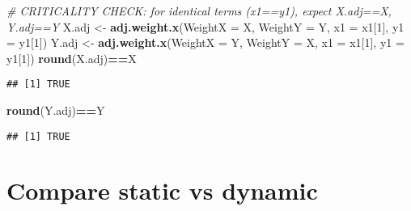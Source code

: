 \documentclass[
]{article}
\newenvironment{Shaded}{\begin{snugshade}}{\end{snugshade}}
\newcommand{\AttributeTok}[1]{\textcolor[rgb]{0.13,0.29,0.53}{#1}}
\newcommand{\CommentTok}[1]{\textcolor[rgb]{0.56,0.35,0.01}{\textit{#1}}}
\newcommand{\DecValTok}[1]{\textcolor[rgb]{0.00,0.00,0.81}{#1}}
\newcommand{\FunctionTok}[1]{\textcolor[rgb]{0.13,0.29,0.53}{\textbf{#1}}}
\newcommand{\NormalTok}[1]{#1}
\newcommand{\OtherTok}[1]{\textcolor[rgb]{0.56,0.35,0.01}{#1}}
\newcommand{\SpecialCharTok}[1]{\textcolor[rgb]{0.81,0.36,0.00}{\textbf{#1}}}
\begin{document}
\begin{Shaded}
\begin{Highlighting}[]
\CommentTok{\# CRITICALITY CHECK: for identical terms (x1==y1), expect X.adj==X, Y.adj==Y}
\NormalTok{X.adj }\OtherTok{\textless{}{-}} \FunctionTok{adj.weight.x}\NormalTok{(}\AttributeTok{WeightX =}\NormalTok{ X, }\AttributeTok{WeightY =}\NormalTok{ Y, }\AttributeTok{x1 =}\NormalTok{ x1[}\DecValTok{1}\NormalTok{], }\AttributeTok{y1 =}\NormalTok{ y1[}\DecValTok{1}\NormalTok{])}
\NormalTok{Y.adj }\OtherTok{\textless{}{-}} \FunctionTok{adj.weight.x}\NormalTok{(}\AttributeTok{WeightX =}\NormalTok{ Y, }\AttributeTok{WeightY =}\NormalTok{ X, }\AttributeTok{x1 =}\NormalTok{ x1[}\DecValTok{1}\NormalTok{], }\AttributeTok{y1 =}\NormalTok{ y1[}\DecValTok{1}\NormalTok{])}
\FunctionTok{round}\NormalTok{(X.adj)}\SpecialCharTok{==}\NormalTok{X}
\end{Highlighting}
\end{Shaded}

\begin{verbatim}
## [1] TRUE
\end{verbatim}

\begin{Shaded}
\begin{Highlighting}[]
\FunctionTok{round}\NormalTok{(Y.adj)}\SpecialCharTok{==}\NormalTok{Y}
\end{Highlighting}
\end{Shaded}

\begin{verbatim}
## [1] TRUE
\end{verbatim}

\hypertarget{compare-static-vs-dynamic}{%
\section{Compare static vs dynamic}\label{compare-static-vs-dynamic}}
\end{document}
